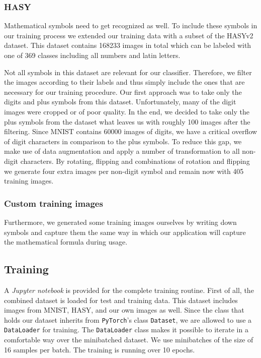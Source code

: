 \documentclass[12pt]{article}
\begin{document}
		\subsubsection{HASY}
			Mathematical symbols need to get recognized as well. To include these symbols in our training process we extended our training data with a subset of the HASYv2\cite{hasy} dataset. This dataset contains 168233 images in total which can be labeled with one of 369 classes including all numbers and latin letters. 
			
			Not all symbols in this dataset are relevant for our classifier. Therefore, we filter the images according to their labels and thus simply include the ones that are necessary for our training procedure. Our first approach was to take only the digits and plus symbols from this dataset. Unfortunately, many of the digit images were cropped or of poor quality. In the end, we decided to take only the plus symbols from the dataset what leaves us with roughly 100 images after the filtering. Since MNIST contains 60000 images of digits, we have a critical overflow of digit characters in comparison to the plus symbols. To reduce this gap, we make use of data augmentation and apply a number of transformation to all non-digit characters. By rotating, flipping and combinations of rotation and flipping we generate four extra images per non-digit symbol and remain now with 405 training images.
			
		\subsubsection{Custom training images}
		Furthermore, we generated some training images ourselves by writing down symbols and capture them the same way in which our application will capture the mathematical formula during usage.
		
	\subsection{Training}
		A \textit{Jupyter notebook} is provided for the complete training routine. First of all, the combined dataset is loaded for test and training data. This dataset includes images from MNIST, HASY, and our own images as well. Since the class that holds our dataset inherits from \texttt{PyTorch}'s class \texttt{Dataset}, we are allowed to use a \texttt{DataLoader} for training. The \texttt{DataLoader} class makes it possible to iterate in a comfortable way over the minibatched dataset. We use minibatches of the size of 16 samples per batch. The training is running over 10 epochs.
		
\end{document}
